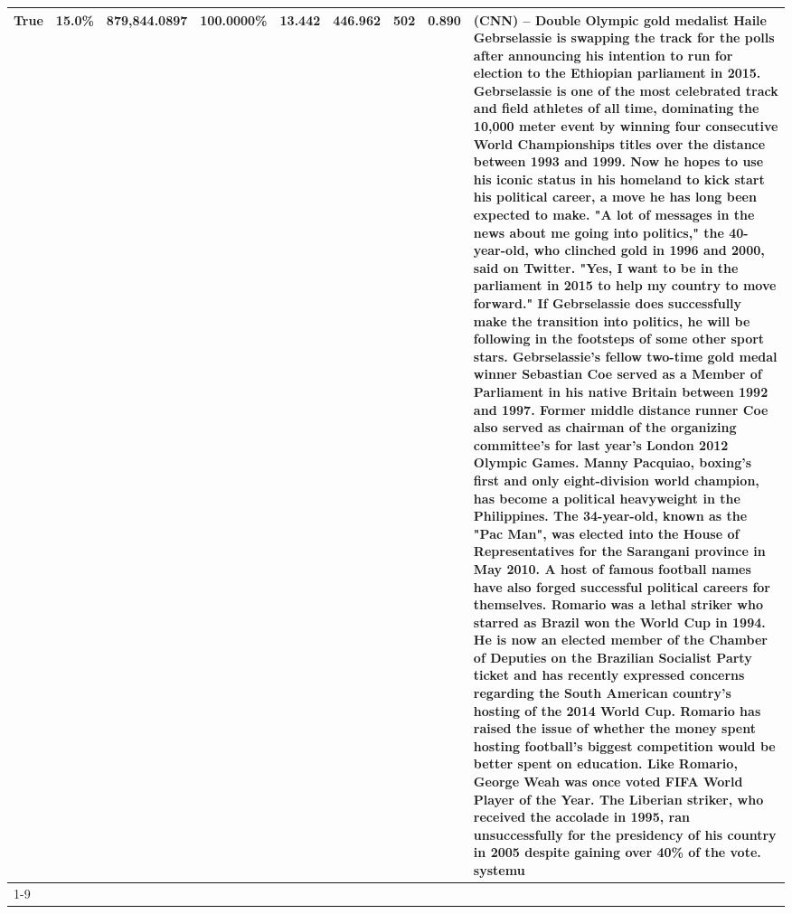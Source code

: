 \begin{table}[H]
{\begin{tabular}{lllrlllll}
True & 15.0\% & 879,844.0897 & \bfseries \color{red} 100.0000\% & 13.442 & 446.962 & 502 & 0.890 & (CNN) -- Double Olympic gold medalist Haile Gebrselassie is swapping the track for the polls after announcing his intention to run for election to the Ethiopian parliament in 2015. Gebrselassie is one of the most celebrated track and field athletes of all time, dominating the 10,000 meter event by winning four consecutive World Championships titles over the distance between 1993 and 1999. Now he hopes to use his iconic status in his homeland to kick start his political career, a move he has long been expected to make. "A lot of messages in the news about me going into politics," the 40-year-old, who clinched gold in 1996 and 2000, said on Twitter. "Yes, I want to be in the parliament in 2015 to help my country to move forward." If Gebrselassie does successfully make the transition into politics, he will be following in the footsteps of some other sport stars. Gebrselassie's fellow two-time gold medal winner Sebastian Coe served as a Member of Parliament in his native Britain between 1992 and 1997. Former middle distance runner Coe also served as chairman of the organizing committee's for last year's London 2012 Olympic Games. Manny Pacquiao, boxing's first and only eight-division world champion, has become a political heavyweight in the Philippines. The 34-year-old, known as the "Pac Man", was elected into the House of Representatives for the Sarangani province in May 2010. A host of famous football names have also forged successful political careers for themselves. Romario was a lethal striker who starred as Brazil won the World Cup in 1994. He is now an elected member of the Chamber of Deputies on the Brazilian Socialist Party ticket and has recently expressed concerns regarding the South American country's hosting of the 2014 World Cup. Romario has raised the issue of whether the money spent hosting football's biggest competition would be better spent on education. Like Romario, George Weah was once voted FIFA World Player of the Year. The Liberian striker, who received the accolade in 1995, ran unsuccessfully for the presidency of his country in 2005 despite gaining over 40\% of the vote. systemu \\
\cline{1-9}

\end{tabular}}
\end{table}
